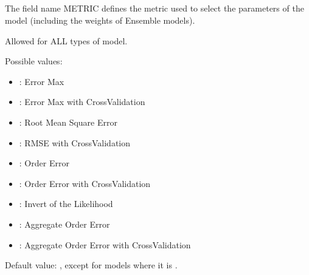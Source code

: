 \documentclass[letterpaper,10pt,english]{sphinxmanual}
\begin{document}
\subsection{}
\label{\detokenize{SgteLib:metric}}\label{\detokenize{SgteLib:id29}}
\begin{DUlineblock}{0em}
\item[] The field name METRIC defines the metric used to select the parameters of the model (including the weights of Ensemble models).
\item[] Allowed for ALL types of model.
\item[] Possible values:
\end{DUlineblock}
\begin{itemize}
\item {} 
\sphinxAtStartPar
{}: Error Max

\item {} 
\sphinxAtStartPar
{}: Error Max with Cross\sphinxhyphen{}Validation

\item {} 
\sphinxAtStartPar
{}: Root Mean Square Error

\item {} 
\sphinxAtStartPar
{}: RMSE with Cross\sphinxhyphen{}Validation

\item {} 
\sphinxAtStartPar
{}: Order Error

\item {} 
\sphinxAtStartPar
{}: Order Error with Cross\sphinxhyphen{}Validation 

\item {} 
\sphinxAtStartPar
{}: Invert of the Likelihood

\item {} 
\sphinxAtStartPar
{}: Aggregate Order Error

\item {} 
\sphinxAtStartPar
{}: Aggregate Order Error with Cross\sphinxhyphen{}Validation 

\end{itemize}

\begin{DUlineblock}{0em}
\item[] Default value: , except for {\hyperref[\detokenize{SgteLib:ensemble-stat}]{}} models where it is .
\end{DUlineblock}
\end{document}
